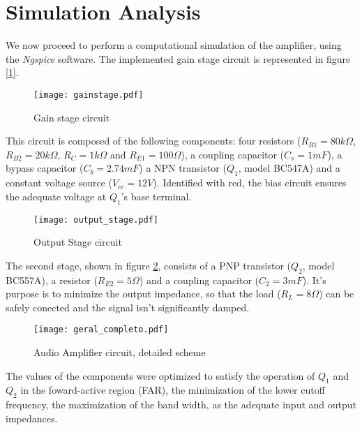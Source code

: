 \section{Simulation Analysis}
\label{sec:simulation}

\par We now proceed to perform a computational simulation of the amplifier, using the \textit{Ngspice} software. The implemented gain stage circuit is represented in figure [\ref{fig:gain_stage}].

\begin{figure}[H]
\centering
  \texttt{[image: gainstage.pdf]}
  \caption{Gain stage circuit}
  \label{fig:gain_stage}
\end{figure}

\par This circuit is composed of the following components: four resistors ($R_{B1}=80k\Omega$, $R_{B2}=20k\Omega$, $R_{C}=1k\Omega$ and $R_{E1}=100\Omega$), a coupling capacitor ($C_s = 1 mF$), a bypass capacitor ($C_b=2.74mF$) a NPN transistor ($Q_1$, model BC547A) and a constant voltage source ($V_{cc}=12V$). Identified with red, the bias circuit ensures the adequate voltage at $Q_1$'s base terminal.

\begin{figure}[H]
\centering
  \texttt{[image: output\_stage.pdf]}
  \caption{Output Stage circuit}
  \label{fig:output_stage}
\end{figure}

\par The second stage, shown in figure \ref{fig:output_stage}, consists of a PNP transistor ($Q_2$, model BC557A), a resistor ($R_{E2}=5\Omega$) and a coupling capacitor ($C_2=3mF$). It's purpose is to minimize the output impedance, so that the load ($R_L=8\Omega$) can be safely conected and the signal isn't significantly damped.

\begin{figure}[H]
\centering
  \texttt{[image: geral\_completo.pdf]}
  \caption{Audio Amplifier circuit, detailed scheme}
  \label{fig:complete_circuit}
\end{figure}

\par The values of the components were optimized to satisfy the operation of $Q_1$ and $Q_2$ in the foward-active region (FAR), the minimization of the lower cutoff frequency, the maximization of the band width, as the adequate input and output impedances.

